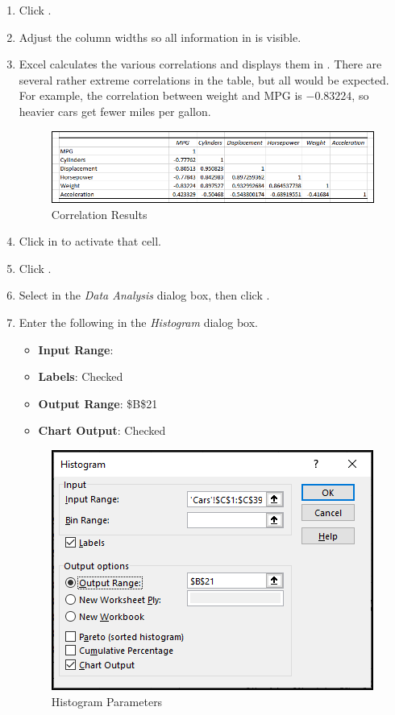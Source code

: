 \begin{enumbox}
\begin{enumerate}
		\item Click .
		\item Adjust the column widths so all information in  is visible.
		\item Excel calculates the various correlations and displays them in . There are several rather extreme correlations in the table, but all would be expected. For example, the correlation between weight and MPG is $ -0.83224 $, so heavier cars get fewer miles per gallon.
		
		\begin{figure}[H]
			\centering
			\includegraphics[width=\maxwidth{.95\linewidth}]{gfx/ch09_fig75}
			\caption{Correlation Results}
			\label{09:fig75}
		\end{figure}
	
		\item Click in  to activate that cell.
		\item Click .
		\item Select  in the \textit{Data Analysis} dialog box, then click .
		\item Enter the following in the \textit{Histogram} dialog box.
	
		\begin{itemize}
			\item \textbf{Input Range}: 
			\item \textbf{Labels}: Checked
			\item \textbf{Output Range}: \$B\$21
			\item \textbf{Chart Output}: Checked
		\end{itemize}
		
		\begin{figure}[H]
			\centering
			\includegraphics[width=\maxwidth{.75\linewidth}]{gfx/ch09_fig76}
			\caption{Histogram Parameters}
			\label{09:fig76}
		\end{figure}
	

\end{enumerate}
\end{enumbox}
